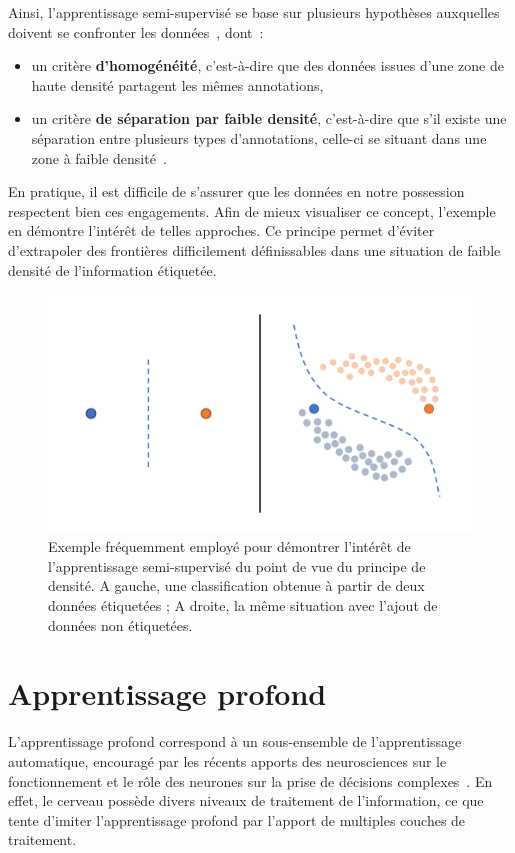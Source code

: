 Ainsi, l'apprentissage semi-supervisé se base sur plusieurs hypothèses auxquelles doivent se confronter les données~\cite{Zhu2009}, dont~:
\begin{itemize}
	\item un critère \textbf{d'homogénéité}, c’est-à-dire que des données issues d'une zone de haute densité partagent les mêmes annotations, 
	\item un critère \textbf{de séparation par faible densité}, c’est-à-dire que s'il existe une  séparation entre plusieurs types d'annotations, celle-ci se situant dans une zone à faible densité~\cite{chapelle2005}.
\end{itemize}
En pratique, il est difficile de s'assurer que les données en notre possession respectent bien ces engagements. Afin de mieux visualiser ce concept, l'exemple en  démontre l'intérêt de telles approches. Ce principe permet d'éviter d'extrapoler des frontières difficilement définissables dans une situation de faible densité de l'information étiquetée.\par
 
\begin{figure}[H]
    \centering
    \includegraphics[width=\linewidth]{contents/chapter_3/resources/example_semi_supervised.pdf}
    \caption{Exemple fréquemment employé pour démontrer l'intérêt de l'apprentissage semi-supervisé du point de vue du principe de densité. A gauche, une classification obtenue à partir de deux données étiquetées ; A droite, la même situation avec l’ajout de données non étiquetées.}
    \label{fig:example_semi_supervised}
\end{figure}

\clearpage

\section{Apprentissage profond}
\label{sec:deep_learning}
L’apprentissage profond correspond à un sous-ensemble de l’apprentissage automatique, encouragé par les récents apports des neurosciences sur le fonctionnement et le rôle des neurones sur la prise de décisions complexes~\cite{Quartz1997,Shrager1996}. En effet, le cerveau possède divers niveaux de traitement de l’information, ce que tente d'imiter l'apprentissage profond par l'apport de multiples couches de traitement.\par


